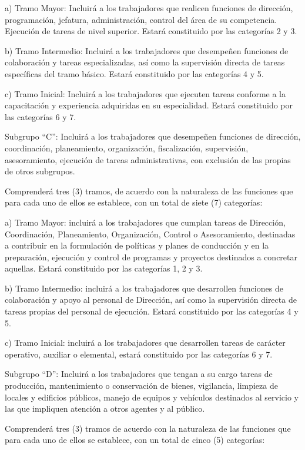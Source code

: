 \documentclass[]{article}
\begin{document}
a) Tramo Mayor: Incluirá a los trabajadores que realicen funciones de
dirección, programación, jefatura, administración, control del área de
su competencia. Ejecución de tareas de nivel superior. Estará
constituido por las categorías 2 y 3.

b) Tramo Intermedio: Incluirá a los trabajadores que desempeñen
funciones de colaboración y tareas especializadas, así como la
supervisión directa de tareas específicas del tramo básico. Estará
constituido por las categorías 4 y 5.

c) Tramo Inicial: Incluirá a los trabajadores que ejecuten tareas
conforme a la capacitación y experiencia adquiridas en su especialidad.
Estará constituido por las categorías 6 y 7.

Subgrupo ``C'': Incluirá a los trabajadores que desempeñen funciones de
dirección, coordinación, planeamiento, organización, fiscalización,
supervisión, asesoramiento, ejecución de tareas administrativas, con
exclusión de las propias de otros subgrupos.

Comprenderá tres (3) tramos, de acuerdo con la naturaleza de las
funciones que para cada uno de ellos se establece, con un total de siete
(7) categorías:

a) Tramo Mayor: incluirá a los trabajadores que cumplan tareas de
Dirección, Coordinación, Planeamiento, Organización, Control o
Asesoramiento, destinadas a contribuir en la formulación de políticas y
planes de conducción y en la preparación, ejecución y control de
programas y proyectos destinados a concretar aquellas. Estará
constituido por las categorías 1, 2 y 3.

b) Tramo Intermedio: incluirá a los trabajadores que desarrollen
funciones de colaboración y apoyo al personal de Dirección, así como la
supervisión directa de tareas propias del personal de ejecución. Estará
constituido por las categorías 4 y 5.

c) Tramo Inicial: incluirá a los trabajadores que desarrollen tareas de
carácter operativo, auxiliar o elemental, estará constituido por las
categorías 6 y 7.

Subgrupo ``D'': Incluirá a los trabajadores que tengan a su cargo tareas
de producción, mantenimiento o conservación de bienes, vigilancia,
limpieza de locales y edificios públicos, manejo de equipos y vehículos
destinados al servicio y las que impliquen atención a otros agentes y al
público.

Comprenderá tres (3) tramos de acuerdo con la naturaleza de las
funciones que para cada uno de ellos se establece, con un total de cinco
(5) categorías:
\end{document}
